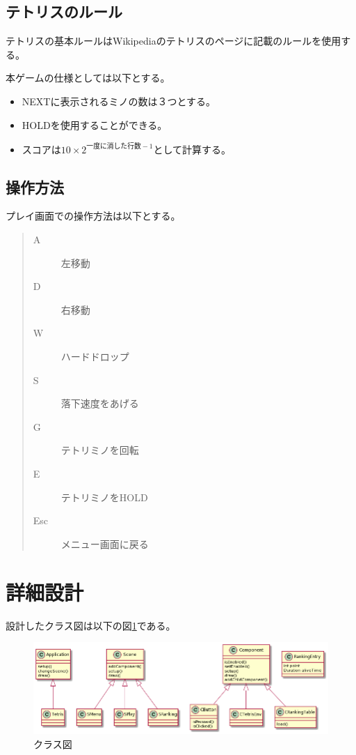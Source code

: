 \documentclass[a4paper,11pt]{jsarticle}
\begin{document}
\subsection{テトリスのルール}
テトリスの基本ルールはWikipediaのテトリスのページ\cite{c0}に記載のルールを使用する。\par
本ゲームの仕様としては以下とする。
\begin{itemize}
  \item NEXTに表示されるミノの数は３つとする。
  \item HOLDを使用することができる。
  \item スコアは$10 \times 2^{一度に消した行数-1}$として計算する。
\end{itemize}

\subsection{操作方法}
プレイ画面での操作方法は以下とする。
\begin{quote}
  \begin{description}
    \item[A] 左移動
    \item[D] 右移動
    \item[W] ハードドロップ
    \item[S] 落下速度をあげる
    \item[G] テトリミノを回転
    \item[E] テトリミノをHOLD
    \item[Esc] メニュー画面に戻る       
  \end{description}
\end{quote}

\section{詳細設計}
設計したクラス図は以下の図\ref{classFigure}である。
\begin{figure}[htbp]
\begin{center}
\includegraphics[width=\textwidth]{class.png}
\caption{クラス図}
\label{classFigure}
\end{center}
\end{figure}
\end{document}
